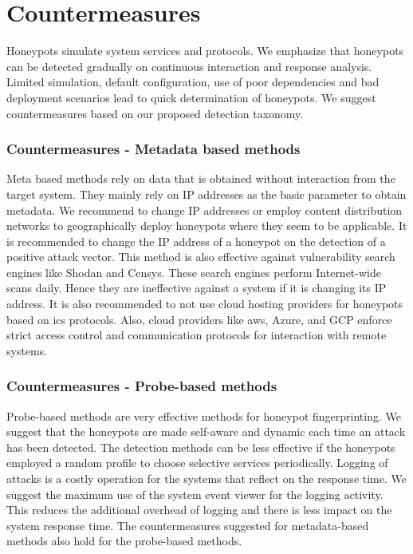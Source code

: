 \section{Countermeasures}
\label{sec:counter}

Honeypots simulate system services and protocols. We emphasize that honeypots can be detected gradually on continuous interaction and response analysis. Limited simulation, default configuration, use of poor dependencies and bad deployment scenarios lead to quick determination of honeypots. We suggest countermeasures based on our proposed detection taxonomy. 

\subsubsection{Countermeasures - Metadata based methods}
Meta based methods rely on data that is obtained without interaction from the target system. They mainly rely on IP addresses as the basic parameter to obtain metadata. We recommend to change IP addresses or employ content distribution networks to geographically deploy honeypots where they seem to be applicable.  It is recommended to change the IP address of a honeypot on the detection of a positive attack vector. This method is also effective against vulnerability search engines like Shodan and Censys. These search engines perform Internet-wide scans daily. Hence they are ineffective against a system if it is changing its IP address. It is also recommended to not use cloud hosting providers for honeypots based on \acrshort{ics} protocols. Also, cloud providers like \acrshort{aws}, Azure, and GCP enforce strict access control and communication protocols for interaction with remote systems. 


\subsubsection{Countermeasures - Probe-based methods}
Probe-based methods are very effective methods for honeypot fingerprinting. We suggest that the honeypots are made self-aware and dynamic each time an attack has been detected. The detection methods can be less effective if the honeypots employed a random profile to choose selective services periodically.  Logging of attacks is a costly operation for the systems that reflect on the response time. We suggest the maximum use of the system event viewer for the logging activity. This reduces the additional overhead of logging and there is less impact on the system response time. The countermeasures suggested for metadata-based methods also hold for the probe-based methods. 

